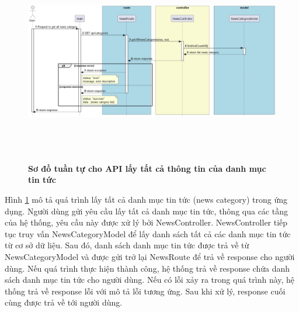 \begin{enumerate}[a)]
\begin{figure}[H]
  \centering
  \includegraphics[width=16cm,height=9cm]{Images/server/sequence/server/getAllNewsCategories.png}
  \caption[Sơ đồ tuần tự cho API lấy tất cả thông tin của danh mục tin tức ]{\bfseries \fontsize{12pt}{0pt}
  \selectfont Sơ đồ tuần tự cho API lấy tất cả thông tin của danh mục tin tức }
  \label{getAllNewsCategories} %
\end{figure}
Hình \ref{getAllNewsCategories} mô tả quá trình lấy tất cả danh mục tin tức (news category) trong ứng dụng. Người dùng gửi yêu cầu lấy tất cả danh mục tin tức, thông qua các tầng của hệ thống, yêu cầu này được xử lý bởi NewsController. NewsController tiếp tục truy vấn NewsCategoryModel để lấy danh sách tất cả các danh mục tin tức từ cơ sở dữ liệu. Sau đó, danh sách danh mục tin tức được trả về từ NewsCategoryModel và được gửi trở lại NewsRoute để trả về response cho người dùng. Nếu quá trình thực hiện thành công, hệ thống trả về response chứa danh sách danh mục tin tức cho người dùng. Nếu có lỗi xảy ra trong quá trình này, hệ thống trả về response lỗi với mô tả lỗi tương ứng. Sau khi xử lý, response cuối cùng được trả về tới người dùng.


\end{enumerate}
